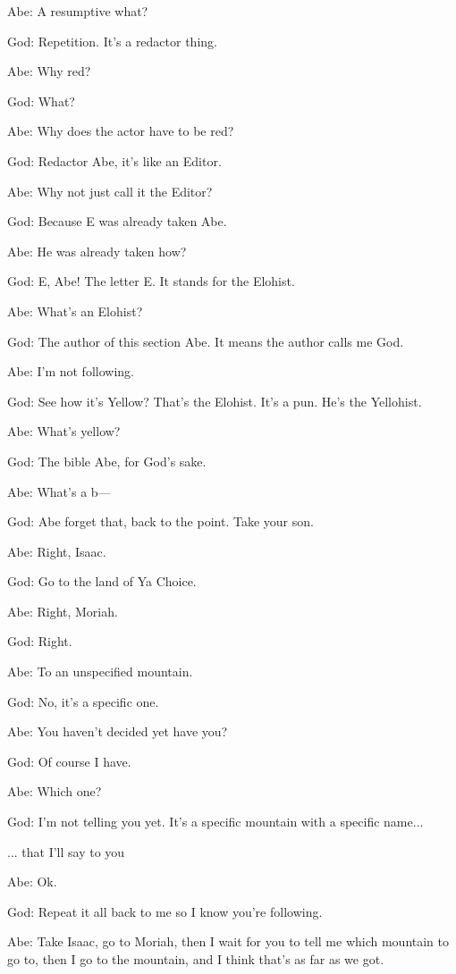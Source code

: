 {\begin{midrash}
	Abe: A resumptive what?

	God: Repetition. It's a redactor thing.

	Abe: Why red?

	God: What?

	Abe: Why does the actor have to be red?

	God: Redactor Abe, it's like an Editor.

	Abe: Why not just call it the Editor?

	God: Because E was already taken Abe.

	Abe: He was already taken how?

	God: E, Abe! The letter E. It stands for the Elohist.

	Abe: What's an Elohist?

	God: The author of this section Abe. It means the author calls me God.

	Abe: I'm not following.

	God: See how it's Yellow? That's the Elohist. It's a pun. He's the Yellohist.

	Abe: What's yellow?

	God: The bible Abe, for God's sake.

	Abe: What's a b---

	God: Abe forget that, back to the point. Take your son.

	Abe: Right, Isaac.

	God: Go to the land of Ya Choice.

	Abe: Right, Moriah.

	God: Right.

	Abe: To an unspecified mountain.

	God: No, it's a specific one.

	Abe: You haven't decided yet have you?

	God: Of course I have.

	Abe: Which one?

	God: I'm not telling you yet. It's a specific mountain with a specific name...

	\end{midrash}

	... that I'll say to you

	\begin{midrash}

	Abe: Ok.

	God: Repeat it all back to me so I know you're following.

	Abe: Take Isaac, go to Moriah, then I wait for you to tell me which mountain to go to, then I go to the mountain, and I think that's as far as we got.


\end{midrash}}
